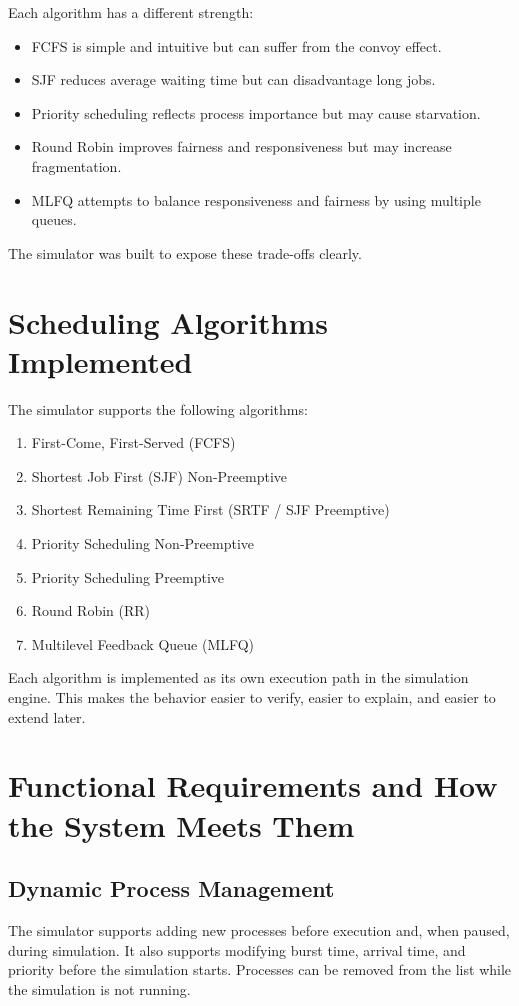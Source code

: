 \documentclass[12pt]{article}
\begin{document}
Each algorithm has a different strength:
\begin{itemize}[leftmargin=*]
    \item FCFS is simple and intuitive but can suffer from the convoy effect.
    \item SJF reduces average waiting time but can disadvantage long jobs.
    \item Priority scheduling reflects process importance but may cause starvation.
    \item Round Robin improves fairness and responsiveness but may increase fragmentation.
    \item MLFQ attempts to balance responsiveness and fairness by using multiple queues.
\end{itemize}

The simulator was built to expose these trade-offs clearly.

\section{Scheduling Algorithms Implemented}
The simulator supports the following algorithms:
\begin{enumerate}[leftmargin=*]
    \item First-Come, First-Served (FCFS)
    \item Shortest Job First (SJF) Non-Preemptive
    \item Shortest Remaining Time First (SRTF / SJF Preemptive)
    \item Priority Scheduling Non-Preemptive
    \item Priority Scheduling Preemptive
    \item Round Robin (RR)
    \item Multilevel Feedback Queue (MLFQ)
\end{enumerate}

Each algorithm is implemented as its own execution path in the simulation engine. This makes the behavior easier to verify, easier to explain, and easier to extend later.

\section{Functional Requirements and How the System Meets Them}
\subsection{Dynamic Process Management}
The simulator supports adding new processes before execution and, when paused, during simulation. It also supports modifying burst time, arrival time, and priority before the simulation starts. Processes can be removed from the list while the simulation is not running.
\end{document}
